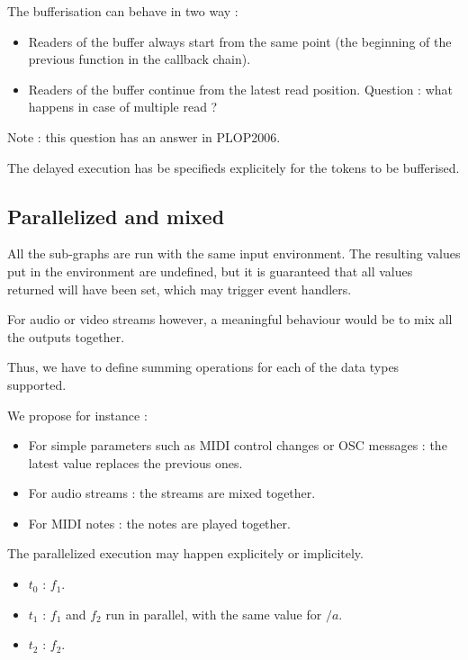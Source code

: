 \documentclass{article}
\begin{document}
	The bufferisation can behave in two way :
	\begin{itemize}
		\item Readers of the buffer always start from the same point (the beginning of the previous function in the callback chain).
		\item Readers of the buffer continue from the latest read position.
		Question : what happens in case of multiple read ?
	\end{itemize}
	
    Note : this question has an answer in PLOP2006.
    
    The delayed execution has be specifieds explicitely for the tokens to be bufferised.
	
	\subsection{Parallelized and mixed}
	All the sub-graphs are run with the same input environment. 
	The resulting values put in the environment are undefined, but it is guaranteed that all values returned will have been set, which may trigger event handlers.
    
    For audio or video streams however, a meaningful behaviour would be to mix all the outputs together.
    
    Thus, we have to define summing operations for each of the data types supported.
    
    We propose for instance : 
    \begin{itemize}
        \item For simple parameters such as MIDI control changes or OSC messages : the latest value replaces the previous ones.
        \item For audio streams : the streams are mixed together.
        \item For MIDI notes : the notes are played together.
    \end{itemize}

    The parallelized execution may happen explicitely or implicitely.

    \begin{itemize}
        \item $t_0$ : $f_1$.
        \item $t_1$ : $f_1$ and $f_2$ run in parallel, with the same value for $/a$.
        \item $t_2$ : $f_2$. 
    \end{itemize}
     
\end{document}
